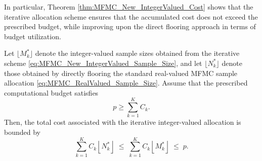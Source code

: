 In particular, Theorem \ref{thm:MFMC_New_IntegerValued_Cost} shows that the iterative allocation scheme ensures that the accumulated cost does not exceed the prescribed budget, while improving upon the direct flooring approach in terms of budget utilization.


\begin{theorem}
\label{thm:MFMC_New_IntegerValued_Cost} 

Let $\lfloor M_k^* \rfloor$ denote the integer-valued sample sizes obtained from the iterative scheme \eqref{eq:MFMC_New_IntegerValued_Sample_Size}, and let $\lfloor N_k^* \rfloor$ denote those obtained by directly flooring the standard real-valued MFMC sample allocation \eqref{eq:MFMC_RealValued_Sample_Size}. 
Assume that the prescribed computational budget satisfies 
%
\begin{equation}\label{eq:p_bound}
     p \ge \sum_{k=1}^K C_k.
\end{equation}
%
Then, the total cost associated with the iterative integer-valued allocation is bounded by
\begin{equation}\label{eq:Iterative_integer_sample_size_cost_bound}
    \sum_{k=1}^K C_k \left\lfloor N_k^* \right\rfloor
    \;\le\;
    \sum_{k=1}^K C_k \left\lfloor M_k^* \right\rfloor
    \;\le\;
    p.
\end{equation}
\end{theorem}


